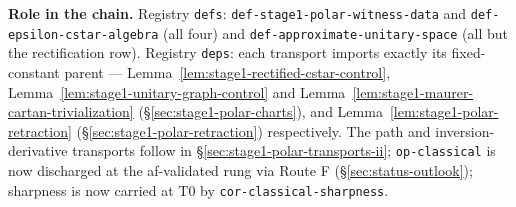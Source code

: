 \noindent\textbf{Role in the chain.} Registry \texttt{defs}:
\texttt{def-stage1-polar-witness-data} and \texttt{def-epsilon-cstar-algebra} (all four)
and \texttt{def-approximate-unitary-space} (all but the rectification row). Registry
\texttt{deps}: each transport imports exactly its fixed-constant parent ---
Lemma~\ref{lem:stage1-rectified-cstar-control},
Lemma~\ref{lem:stage1-unitary-graph-control} and
Lemma~\ref{lem:stage1-maurer-cartan-trivialization} (\S\ref{sec:stage1-polar-charts}), and
Lemma~\ref{lem:stage1-polar-retraction} (\S\ref{sec:stage1-polar-retraction})
respectively. The path and inversion-derivative transports follow in
\S\ref{sec:stage1-polar-transports-ii}; \texttt{op-classical} is now discharged at the af-validated rung via Route F (\S\ref{sec:status-outlook}); sharpness is now carried at T0 by \texttt{cor-classical-sharpness}.
